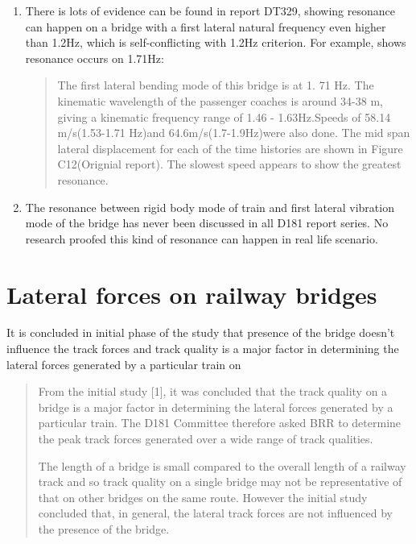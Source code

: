 \begin{appendices}
\begin{enumerate} 
    \item There is lots of evidence can be found in report DT329, showing resonance can happen on a bridge with a first lateral natural frequency even higher than 1.2Hz, which is self-conflicting with 1.2Hz criterion. For example, \cite[Page 14,Phase II]{d181dt329} shows resonance occurs on 1.71Hz:
        \begin{quote}
            The first lateral bending mode of this bridge is at 1. 71 Hz. The kinematic wavelength of the passenger coaches is around 34-38 m, giving a kinematic frequency range of 1.46 - 1.63Hz.Speeds of 58.14 m/s(1.53-1.71 Hz)and 64.6m/s(1.7-1.9Hz)were also done. The mid span lateral displacement for each of the time histories are shown in Figure C12(Orignial report). The slowest speed appears to show the greatest resonance.
        \end{quote}
    \item The resonance between rigid body mode of train and first lateral vibration mode of the bridge has never been discussed in all D181 report series. No research proofed this kind of resonance can happen in real life scenario.
\end{enumerate}

\section{Lateral forces on railway bridges}
It is concluded in initial phase of the study that presence of the bridge doesn't influence the track forces and track quality is a major factor in determining the lateral forces generated by a particular train on \cite[Page 7, Secondary Phase]{d181dt329}

\begin{quote}
    From the initial study [1], it was concluded that the track quality on a bridge is a major factor in determining the lateral forces generated by a particular train. The D181 Committee therefore asked BRR to determine the peak track forces generated over a wide range of track qualities.

    The length of a bridge is small compared to the overall length of a railway track and so track quality on a single bridge may not be representative of that on other bridges on the same route. However the initial study concluded that, in general, the lateral track forces are not influenced by the presence of the bridge.
\end{quote}


\end{appendices}
